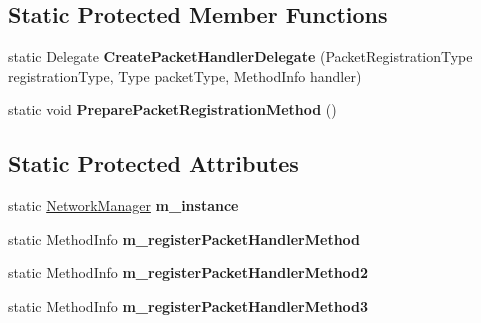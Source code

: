 \subsection*{Static Protected Member Functions}
\begin{DoxyCompactItemize}
\item 
\hypertarget{class_s_e_mod_a_p_i_internal_1_1_a_p_i_1_1_common_1_1_network_manager_a3cfb1366eb29e4450c147487fb5cc9af}{}static Delegate {\bfseries Create\+Packet\+Handler\+Delegate} (Packet\+Registration\+Type registration\+Type, Type packet\+Type, Method\+Info handler)\label{class_s_e_mod_a_p_i_internal_1_1_a_p_i_1_1_common_1_1_network_manager_a3cfb1366eb29e4450c147487fb5cc9af}

\item 
\hypertarget{class_s_e_mod_a_p_i_internal_1_1_a_p_i_1_1_common_1_1_network_manager_a9be7bdfef3a239f289ff69bb9dd353b6}{}static void {\bfseries Prepare\+Packet\+Registration\+Method} ()\label{class_s_e_mod_a_p_i_internal_1_1_a_p_i_1_1_common_1_1_network_manager_a9be7bdfef3a239f289ff69bb9dd353b6}

\end{DoxyCompactItemize}
\subsection*{Static Protected Attributes}
\begin{DoxyCompactItemize}
\item 
\hypertarget{class_s_e_mod_a_p_i_internal_1_1_a_p_i_1_1_common_1_1_network_manager_aaf2f8072408cad5c0297967b33944df0}{}static \hyperlink{class_s_e_mod_a_p_i_internal_1_1_a_p_i_1_1_common_1_1_network_manager}{Network\+Manager} {\bfseries m\+\_\+instance}\label{class_s_e_mod_a_p_i_internal_1_1_a_p_i_1_1_common_1_1_network_manager_aaf2f8072408cad5c0297967b33944df0}

\item 
\hypertarget{class_s_e_mod_a_p_i_internal_1_1_a_p_i_1_1_common_1_1_network_manager_ab0c1b006f2163d8ae94931ad2d1df876}{}static Method\+Info {\bfseries m\+\_\+register\+Packet\+Handler\+Method}\label{class_s_e_mod_a_p_i_internal_1_1_a_p_i_1_1_common_1_1_network_manager_ab0c1b006f2163d8ae94931ad2d1df876}

\item 
\hypertarget{class_s_e_mod_a_p_i_internal_1_1_a_p_i_1_1_common_1_1_network_manager_ab25bfb7b54ccd42c8c6df2bba34e5ca9}{}static Method\+Info {\bfseries m\+\_\+register\+Packet\+Handler\+Method2}\label{class_s_e_mod_a_p_i_internal_1_1_a_p_i_1_1_common_1_1_network_manager_ab25bfb7b54ccd42c8c6df2bba34e5ca9}

\item 
\hypertarget{class_s_e_mod_a_p_i_internal_1_1_a_p_i_1_1_common_1_1_network_manager_afbf1638fce2ac0e9533821959209e87b}{}static Method\+Info {\bfseries m\+\_\+register\+Packet\+Handler\+Method3}\label{class_s_e_mod_a_p_i_internal_1_1_a_p_i_1_1_common_1_1_network_manager_afbf1638fce2ac0e9533821959209e87b}

\end{DoxyCompactItemize}
